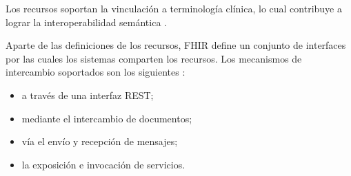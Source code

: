 Los recursos soportan la vinculación a terminología clínica, lo cual contribuye a lograr la interoperabilidad semántica \cite{FHIRArchitecture}.

Aparte de las definiciones de los recursos, FHIR define un conjunto de interfaces por las cuales los sistemas comparten los recursos. Los mecanismos de intercambio soportados son los siguientes \cite{FHIRClinician}:
\begin{itemize}
  \item a través de una interfaz REST;
  \item mediante el intercambio de documentos;
  \item vía el envío y recepción de mensajes;
  \item la exposición e invocación de servicios.
\end{itemize}
